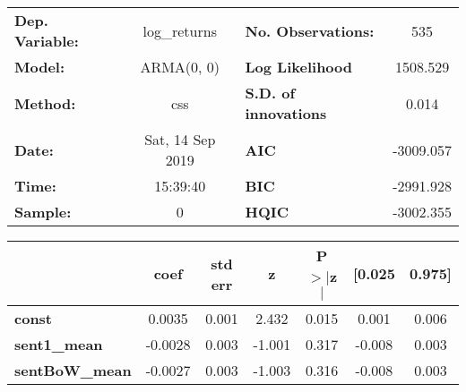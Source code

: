 \begin{center}
\begin{tabular}{lclc}
\toprule
\textbf{Dep. Variable:} &   log\_returns   & \textbf{  No. Observations:  } &    535      \\
\textbf{Model:}         &    ARMA(0, 0)    & \textbf{  Log Likelihood     } &  1508.529   \\
\textbf{Method:}        &       css        & \textbf{  S.D. of innovations} &   0.014     \\
\textbf{Date:}          & Sat, 14 Sep 2019 & \textbf{  AIC                } & -3009.057   \\
\textbf{Time:}          &     15:39:40     & \textbf{  BIC                } & -2991.928   \\
\textbf{Sample:}        &        0         & \textbf{  HQIC               } & -3002.355   \\
\bottomrule
\end{tabular}
\begin{tabular}{lcccccc}
                       & \textbf{coef} & \textbf{std err} & \textbf{z} & \textbf{P$> |$z$|$} & \textbf{[0.025} & \textbf{0.975]}  \\
\midrule
\textbf{const}         &       0.0035  &        0.001     &     2.432  &         0.015        &        0.001    &        0.006     \\
\textbf{sent1\_mean}   &      -0.0028  &        0.003     &    -1.001  &         0.317        &       -0.008    &        0.003     \\
\textbf{sentBoW\_mean} &      -0.0027  &        0.003     &    -1.003  &         0.316        &       -0.008    &        0.003     \\
\bottomrule
\end{tabular}
\end{center}
